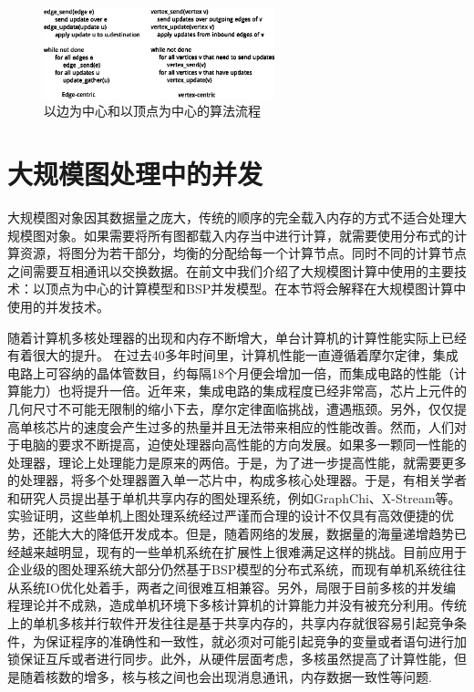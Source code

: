 \begin{figure}[htbp]
\centering
\includegraphics[width=0.6\textwidth]{myfigures/edgevertexcentric.eps}
\caption{以边为中心和以顶点为中心的算法流程}\label{fig:evc}
\vspace{\baselineskip}
\end{figure}

\section{大规模图处理中的并发}

大规模图对象因其数据量之庞大，传统的顺序的完全载入内存的方式不适合处理大规模图对象。如果需要将所有图都载入内存当中进行计算，就需要使用分布式的计算资源，将图分为若干部分，均衡的分配给每一个计算节点。同时不同的计算节点之间需要互相通讯以交换数据。在前文中我们介绍了大规模图计算中使用的主要技术：以顶点为中心的计算模型和BSP并发模型。在本节将会解释在大规模图计算中使用的并发技术。


随着计算机多核处理器的出现和内存不断增大，单台计算机的计算性能实际上已经有着很大的提升。
在过去40多年时间里，计算机性能一直遵循着摩尔定律，集成电路上可容纳的晶体管数目，约每隔18个月便会增加一倍，而集成电路的性能（计算能力）也将提升一倍。近年来，集成电路的集成程度已经非常高，芯片上元件的几何尺寸不可能无限制的缩小下去，摩尔定律面临挑战，遭遇瓶颈。另外，仅仅提高单核芯片的速度会产生过多的热量并且无法带来相应的性能改善。然而，人们对于电脑的要求不断提高，迫使处理器向高性能的方向发展。如果多一颗同一性能的处理器，理论上处理能力是原来的两倍。于是，为了进一步提高性能，就需要更多的处理器，将多个处理器置入单一芯片中，构成多核心处理器。于是，有相关学者和研究人员提出基于单机共享内存的图处理系统，例如GraphChi、X-Stream等。实验证明，这些单机上图处理系统经过严谨而合理的设计不仅具有高效便捷的优势，还能大大的降低开发成本。但是，随着网络的发展，数据量的海量递增趋势已经越来越明显，现有的一些单机系统在扩展性上很难满足这样的挑战。目前应用于企业级的图处理系统大部分仍然基于BSP模型的分布式系统，而现有单机系统往往从系统IO优化处着手，两者之间很难互相兼容。另外，局限于目前多核的并发编程理论并不成熟，造成单机环境下多核计算机的计算能力并没有被充分利用。传统上的单机多核并行软件开发往往是基于共享内存的，共享内存就很容易引起竞争条件，为保证程序的准确性和一致性，就必须对可能引起竞争的变量或者语句进行加锁保证互斥或者进行同步。此外，从硬件层面考虑，多核虽然提高了计算性能，但是随着核数的增多，核与核之间也会出现消息通讯，内存数据一致性等问题.

